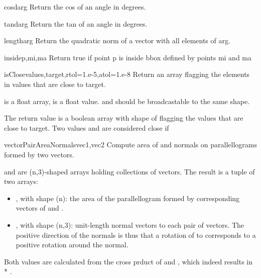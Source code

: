 {{\begin{funcdesc}{cosd}{arg}
    Return the cos of an angle in degrees.
\end{funcdesc}

\begin{funcdesc}{tand}{arg}
    Return the tan of an angle in degrees.
\end{funcdesc}

\begin{funcdesc}{length}{arg}
    Return the quadratic norm of a vector with all elements of arg.
\end{funcdesc}

\begin{funcdesc}{inside}{p,mi,ma}
    Return true if point p is inside bbox defined by points mi and ma
\end{funcdesc}


\begin{funcdesc}{isClose}{values,target,rtol=1.e-5,atol=1.e-8}
Return an array flagging the elements in values that are close to target.

 is a float array,  is a float value.
 and  should be broadcastable to the same shape.
    
The return value is a boolean array with shape of  flagging
the values that are close to target.
Two values  and   are considered close if 
\end{funcdesc}

\begin{funcdesc}{vectorPairAreaNormals}{vec1,vec2}
Compute area of and normals on parallellograms formed by two vectors.

 and  are (n,3)-shaped arrays holding collections of vectors. 
The result is a tuple of two arrays:
\begin{itemize}
\item {}, with shape (n): the area of the parallellogram formed by corresponding vectors of  and .
\item {}, with shape (n,3): unit-length normal vectors to each pair of vectors. The positive direction of the normals is thus that a rotation of  to  corresponds to a positive rotation around the normal.
\end{itemize}
Both values are calculated from the cross prduct of  and , which indeed results in  * .
\end{funcdesc}

}}
